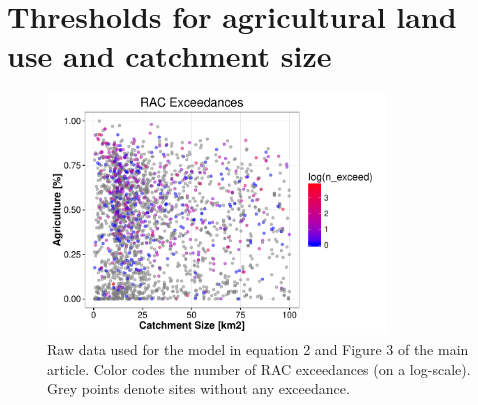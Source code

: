 \documentclass[pdftex,
	a4paper,
	titlepage=false]{scrreprt}
\begin{document}

\newpage





\chapter{Thresholds for agricultural land use and catchment size}
\begin{figure}[ht]
	\centering
	\includegraphics[width = 0.8\textwidth]{ezgagrirac}
	\caption[Raw data used for the model in equation 2 and Figure 3 of the main article.]{Raw data used for the model in equation 2 and Figure 3 of the main article. Color codes the number of RAC exceedances (on a log-scale). Grey points denote sites without any exceedance.}
	\label{fig:ezgagrirac}
\end{figure}



\end{document}
